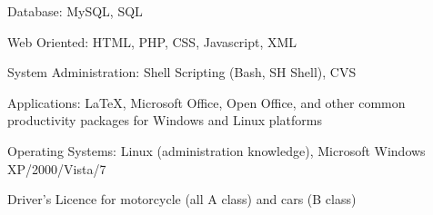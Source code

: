\documentclass[10pt]{article}
\newcommand{\blankline}{\quad\pagebreak[2]}
\begin{document}
Database: MySQL, SQL

Web Oriented: HTML, PHP, CSS, Javascript, XML

System Administration: Shell Scripting (Bash, SH Shell), CVS

\blankline

Applications: \LaTeX{}, Microsoft Office, Open Office,
        and other common productivity packages for Windows and
        Linux platforms

\blankline

Operating Systems: Linux (administration knowledge), Microsoft Windows XP/2000/Vista/7

\blankline

Driver's Licence for motorcycle (all A class) and cars (B class)

\blankline
\end{document}
